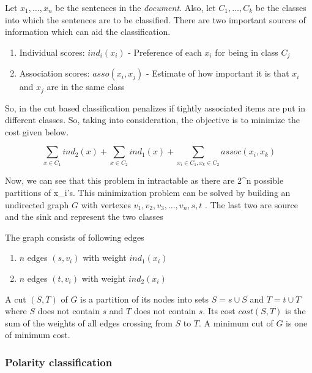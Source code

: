 Let \(x_1,\dots,x_n\) be the sentences in the \textit{document}. Also, let \(C_1,\dots,C_k\) be the classes into which the sentences are to be classified.
There are two important sources of information which can aid the classification. 

\begin{enumerate}
 \item Individual scores: \(ind_i(x_i)\) - Preference of each \(x_i\) for being in class \(C_j\)
 \item Association scores: \(asso(x_i , x_j)\) - Estimate of how important it is that \(x_i\) and \(x_j\) are in the same class
\end{enumerate}

So, in the cut based classification penalizes if tightly associated items are put in different classes. So, taking into consideration,
the objective is to minimize the cost given below.

\begin{equation}
 \sum_{x\in C_1} ind_2(x) + \sum_{x\in C_2} ind_1(x) + \sum_{x_i \in C_1, x_k \in C_2} assoc(x_i,x_k)
\end{equation}

Now, we can see that this problem in intractable as there are 2^n possible partitions of x_i's. This minimization problem can be solved by
building an undirected graph \(G\) with vertexes \({ v_1, v_2 , v_3 ,\dots, v_n , s, t }\) . The last two are source and the sink and represent the two classes

The graph consists of following edges

\begin{enumerate}
  \item \(n\) edges \((s, v_i )\) with weight \(ind_1 (x_i )\)
  \item \(n\) edges \((t, v_i )\) with weight \(ind_2(x_i)\)
\end{enumerate}

A cut \((S, T)\) of \(G\) is a partition of its nodes into sets \(S = {s} \cup S\) and \(T = {t} \cup T\) where \(S\) does not contain 
\(s\) and \(T\) does not contain \(s\). Its cost \(cost(S, T )\) is the sum of the weights of all edges crossing from \(S\) to \(T\). 
A minimum cut of \(G\) is one of minimum cost.

\subsubsection*{Polarity classification}


